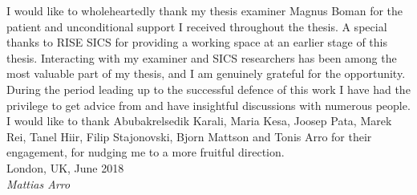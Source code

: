 I would like to wholeheartedly thank my thesis examiner Magnus Boman for the patient and unconditional support I received throughout the thesis.
A special thanks to RISE SICS for providing a working space at an earlier stage of this thesis.
Interacting with my examiner and SICS researchers has been among the most valuable part of my thesis, and I am genuinely grateful for the opportunity.
During the period leading up to the successful defence of this work I have had the privilege to get advice from and have insightful discussions with numerous people.
I would like to thank Abubakrelsedik Karali, Maria Kesa, Joosep Pata, Marek Rei, Tanel Hiir, Filip Stajonovski, Bjorn Mattson and Tonis Arro for their engagement, for nudging me to a more fruitful direction.\\

\noindent
London, UK, June 2018 \\
\textit{Mattias Arro}
\newpage
